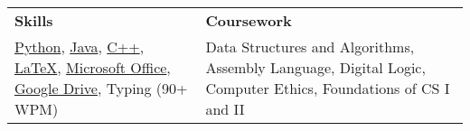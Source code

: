 \documentclass[letterpaper, 10pt]{article}
\begin{document}
    
    
    
    
    
    
    
    
\setlength{\tabcolsep}{16pt}

\begin{tabularx}{\textwidth}{p{}p{}}
    \textbf{Skills} & \textbf{Coursework}\\
    
        \href{https://www.python.org/}{Python},
        \href{https://en.wikipedia.org/wiki/Java_(programming_language)}{Java},
        \href{https://en.wikipedia.org/wiki/C\%2B\%2B}{C++},
        \href{https://www.latex-project.org/}{\LaTeX},
        \href{https://www.office.com/}{Microsoft Office},
        \href{http://drive.google.com}{Google Drive},
        Typing (90+ WPM)
        
        &
        
        Data Structures and Algorithms,
        Assembly Language,
        Digital Logic,
        Computer Ethics,
        Foundations of CS I and II
        
\end{tabularx}

\setlength{\tabcolsep}{16pt}
\end{document}
